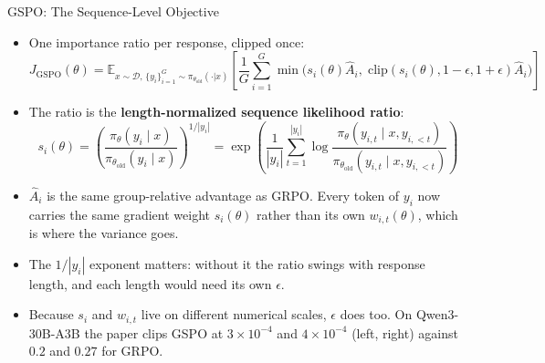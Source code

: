 \begin{frame}[allowframebreaks]{GSPO: The Sequence-Level Objective}
  \begin{itemize}\itemsep0.3em
    \item[\textcolor{red}{$\blacktriangleright$}] One importance ratio per response, clipped once:
      \begin{equation}
        J_{\mathrm{GSPO}}(\theta) = \mathbb{E}_{x \sim \mathcal{D},\, \{y_i\}_{i=1}^G \sim \pi_{\theta_{\mathrm{old}}}(\cdot|x)}
        \left[ \frac{1}{G} \sum_{i=1}^{G} \min\big(s_i(\theta)\hat{A}_i,\; \mathrm{clip}(s_i(\theta), 1-\epsilon, 1+\epsilon)\hat{A}_i\big) \right]
      \end{equation}
    \item[\textcolor{red}{$\blacktriangleright$}] The ratio is the \textbf{length-normalized sequence likelihood ratio}:
      \begin{equation}
        s_i(\theta) = \left( \frac{\pi_\theta(y_i \mid x)}{\pi_{\theta_{\mathrm{old}}}(y_i \mid x)} \right)^{1/|y_i|}
        = \exp\!\left( \frac{1}{|y_i|} \sum_{t=1}^{|y_i|} \log \frac{\pi_\theta(y_{i,t} \mid x, y_{i,<t})}{\pi_{\theta_{\mathrm{old}}}(y_{i,t} \mid x, y_{i,<t})} \right)
      \end{equation}
    \framebreak
    \item[\textcolor{red}{$\blacktriangleright$}] $\hat{A}_i$ is the same group-relative advantage as GRPO. Every token of $y_i$ now carries the same gradient weight $s_i(\theta)$ rather than its own $w_{i,t}(\theta)$, which is where the variance goes.
    \item[\textcolor{red}{$\blacktriangleright$}] The $1/|y_i|$ exponent matters: without it the ratio swings with response length, and each length would need its own $\epsilon$.
    \item[\textcolor{red}{$\blacktriangleright$}] Because $s_i$ and $w_{i,t}$ live on different numerical scales, $\epsilon$ does too. On Qwen3-30B-A3B the paper clips GSPO at $3\times10^{-4}$ and $4\times10^{-4}$ (left, right) against $0.2$ and $0.27$ for GRPO.
  \end{itemize}
\end{frame}

